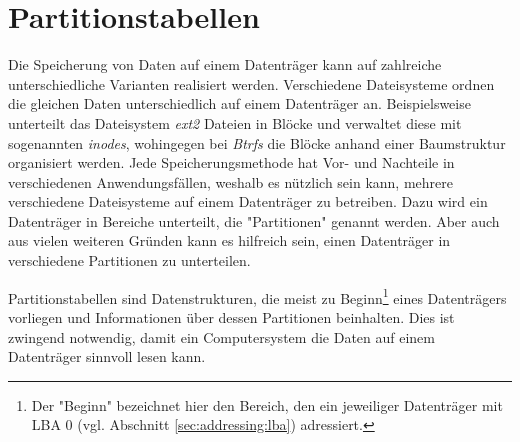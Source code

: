 \section{Partitionstabellen}
Die Speicherung von Daten auf einem Datenträger kann auf zahlreiche unterschiedliche Varianten realisiert werden.
Verschiedene Dateisysteme ordnen die gleichen Daten unterschiedlich auf einem Datenträger an.
Beispielsweise unterteilt das Dateisystem \textit{ext2} Dateien in Blöcke und verwaltet diese mit sogenannten \textit{inodes}, wohingegen bei \textit{Btrfs} die Blöcke anhand einer Baumstruktur organisiert werden. 
Jede Speicherungsmethode hat Vor- und Nachteile in verschiedenen Anwendungsfällen, weshalb es nützlich sein kann, mehrere verschiedene Dateisysteme auf einem Datenträger zu betreiben.
Dazu wird ein Datenträger in Bereiche unterteilt, die "Partitionen" genannt werden.
Aber auch aus vielen weiteren Gründen kann es hilfreich sein, einen Datenträger in verschiedene Partitionen zu unterteilen.

Partitionstabellen sind Datenstrukturen, die meist zu Beginn\footnote{
    Der "Beginn" bezeichnet hier den Bereich, den ein jeweiliger Datenträger mit LBA 0 (vgl. Abschnitt \ref{sec:addressing:lba}) adressiert.
}
eines Datenträgers vorliegen und Informationen über dessen Partitionen beinhalten.
Dies ist zwingend notwendig, damit ein Computersystem die Daten auf einem Datenträger sinnvoll lesen kann.